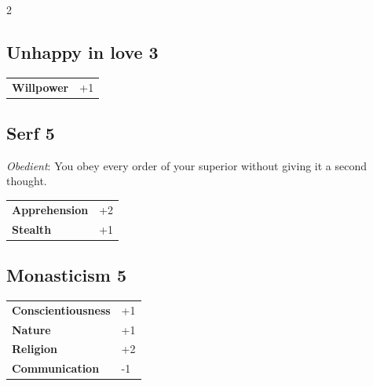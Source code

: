 \begin{multicols}{2}
\begin{tcolorbox}
\end{tcolorbox}

\begin{tcolorbox}
    \subsection*{Unhappy in love \hfill \small{3 }}
    \tcblower




\begin{tabular}{@{}ll@{}}
    \textbf{Willpower} & +1\\
\end{tabular}


\end{tcolorbox}

\begin{tcolorbox}
    \subsection*{Serf \hfill \small{5 }}
    \tcblower
\textit{Obedient}: You obey every order of your superior without giving it a second thought.


\vspace{3mm}

\begin{tabular}{@{}ll@{}}
    \textbf{Apprehension} & +2\\
    \textbf{Stealth} & +1\\
\end{tabular}


\end{tcolorbox}

\begin{tcolorbox}
    \subsection*{Monasticism \hfill \small{5 }}
    \tcblower




\begin{tabular}{@{}ll@{}}
    \textbf{Conscientiousness} & +1\\
    \textbf{Nature} & +1\\
    \textbf{Religion} & +2\\
    \textbf{Communication} & -1\\
\end{tabular}


\end{tcolorbox}
\end{multicols}

